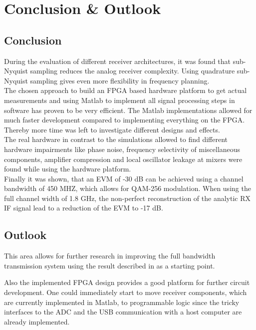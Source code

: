 \chapter{Conclusion \& Outlook}
\section{Conclusion}
During the evaluation of different receiver architectures, it was found
that sub-Nyquist sampling reduces the analog receiver complexity.
Using quadrature sub-Nyquist sampling gives even more flexibility in frequency
planning. \\

The chosen approach to build an \gls{FPGA} based hardware platform to get
actual measurements and using Matlab to implement all signal processing steps
in software has proven to be very efficient. The Matlab implementations
allowed for much faster development compared to implementing everything on the
\gls{FPGA}. Thereby more time was left to investigate different designs and
effects. \\

The real hardware in contrast to the simulations allowed to find
different hardware impairments like phase noise, frequency selectivity of
miscellaneous components, amplifier compression and local oscillator leakage at
mixers were found while using the hardware platform. \\

Finally it was shown, that an \gls{EVM} of -30 dB can be achieved using a channel
bandwidth of 450 MHZ, which allows for \gls{QAM}-256 modulation.
When using the full channel width of 1.8 GHz, the non-perfect
reconstruction of the analytic \gls{RX} \gls{IF} signal lead to a reduction of the
\gls{EVM} to -17 dB. 

\section{Outlook}
This area allows for further research in improving
the full bandwidth transmission system using the result described in
 as a starting point.

Also the implemented \gls{FPGA} design provides a good platform
for further circuit development. One could immediately start to
move receiver components, which are currently implemented in Matlab,
to programmable logic since the tricky interfaces to the \gls{ADC}
and the \gls{USB} communication with a host computer are already implemented.

